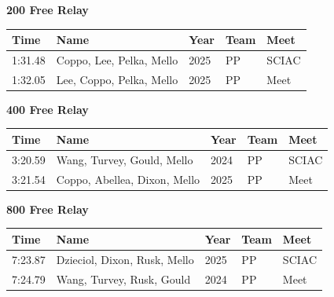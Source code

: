 \vspace{1.2em}
\noindent\begin{minipage}[t]{0.98\textwidth}
\centering
\textbf{\textcolor{teamprimary}{200 Free Relay}}\par
\vspace{0.5em}
\centering
\small
\renewcommand{\arraystretch}{1.0}
\setlength{\tabcolsep}{4pt}
\begin{tabular}{@{}p{2.7cm}p{4.3cm}p{1.6cm}p{2.7cm}p{2.7cm}@{}}
\toprule
\textbf{Time} & \textbf{Name} & \textbf{Year} & \textbf{Team} & \textbf{Meet} \\
\midrule
1:31.48 & Coppo, Lee, Pelka, Mello & 2025 & PP & SCIAC \\
1:32.05 & Lee, Coppo, Pelka, Mello & 2025 & PP & Meet \\
\bottomrule
\end{tabular}
\end{minipage}
\vspace{1.2em}
\noindent\begin{minipage}[t]{0.98\textwidth}
\centering
\textbf{\textcolor{teamprimary}{400 Free Relay}}\par
\vspace{0.5em}
\centering
\small
\renewcommand{\arraystretch}{1.0}
\setlength{\tabcolsep}{4pt}
\begin{tabular}{@{}p{2.7cm}p{4.3cm}p{1.6cm}p{2.7cm}p{2.7cm}@{}}
\toprule
\textbf{Time} & \textbf{Name} & \textbf{Year} & \textbf{Team} & \textbf{Meet} \\
\midrule
3:20.59 & Wang, Turvey, Gould, Mello & 2024 & PP & SCIAC \\
3:21.54 & Coppo, Abellea, Dixon, Mello & 2025 & PP & Meet \\
\bottomrule
\end{tabular}
\end{minipage}
\vspace{1.2em}
\noindent\begin{minipage}[t]{0.98\textwidth}
\centering
\textbf{\textcolor{teamprimary}{800 Free Relay}}\par
\vspace{0.5em}
\centering
\small
\renewcommand{\arraystretch}{1.0}
\setlength{\tabcolsep}{4pt}
\begin{tabular}{@{}p{2.7cm}p{4.3cm}p{1.6cm}p{2.7cm}p{2.7cm}@{}}
\toprule
\textbf{Time} & \textbf{Name} & \textbf{Year} & \textbf{Team} & \textbf{Meet} \\
\midrule
7:23.87 & Dzieciol, Dixon, Rusk, Mello & 2025 & PP & SCIAC \\
7:24.79 & Wang, Turvey, Rusk, Gould & 2024 & PP & Meet \\
\bottomrule
\end{tabular}
\end{minipage}
